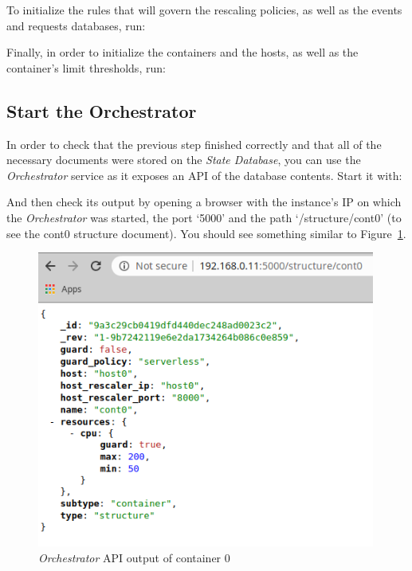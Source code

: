 \documentclass[12pt]{article}
\begin{document}
To initialize the rules that will govern the rescaling policies, as well as the events and requests databases, run: \newline

\noindent {} \newline
{} \newline

Finally, in order to initialize the containers and the hosts, as well as the container's limit thresholds, run: \newline

\noindent {} \newline
{} \newline

\subsection{Start the Orchestrator}

In order to check that the previous step finished correctly and that all of the necessary documents were stored on the \textit{State Database}, you can use the \textit{Orchestrator} service as it exposes an API of the database contents. Start it with: \newline

\noindent {} \newline

And then check its output by opening a browser with the instance's IP on which the \textit{Orchestrator} was started, the port `5000' and the path `/structure/cont0' (to see the cont0 structure document). You should see something similar to Figure~\ref{fig:OrchestratorAPI}.

\begin{figure}[!tb]
	\centering
	\includegraphics[width=0.99\textwidth]{../img/quickstart/OrchestratorCont0.png}
	\caption{\textit{Orchestrator} API output of container 0}
	\label{fig:OrchestratorAPI}
\end{figure}
\end{document}
